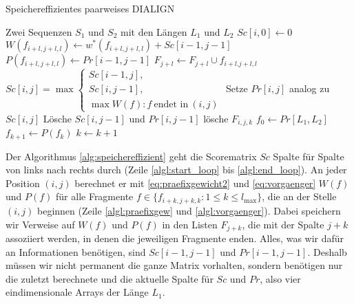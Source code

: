 \begin{breakablealgorithm}
	\caption{Speichereffizientes paarweises DIALIGN}
	\label{alg:speichereffizient}
	\begin{algorithmic}[1]
		
		\Require Zwei Sequenzen $S_1$ und $S_2$ mit den Längen $L_1$ und $L_2$
		\State $Sc[i,0] \gets 0$
		\EndFor
		\label{algl:start_loop}
		\label{algl:fragmentgewichte}
		\State $W(f_{i+l,j+l,l}) \gets w^*(f_{i+l,j+l,l}) + Sc[i\!-\!1,j\!-\!1]$\label{algl:praefixgew}
		\State $P(f_{i+l,j+l,l}) \gets Pr[i\!-\!1,j\!-\!1]$\label{algl:vorgaenger}
		\State $F_{j+l} \gets F_{j+l} \cup {f_{i+l.j+l,l}}$\label{algl:fragmentliste}
		\EndFor
		\State
		$Sc[i,j] = \max
		\begin{cases}
		Sc[i\!-\!1,j], \\
		Sc[i,j\!-\!1], \\
		\max{W(f): f\: \text{endet in}\: (i,j)}
		\end{cases}$\label{algl:praefix}
		\State Setze $Pr[i,j]$ analog zu $Sc[i,j]$\label{algl:ende_opt_kette}
		\State Lösche $Sc[i,j\!-\!1]$ und $Pr[i,j\!-\!1]$\label{algl:del_frags}
		\State lösche $F_{i,j,k}$
		\EndFor
		\EndFor
		\EndFor\label{algl:end_loop}
		\State $f_0 \gets Pr[L_1,L_2]$
		\State $f_{k+1} \gets P(f_{k})$
		\State $k \gets k+1$
		\EndWhile 
		\EndProcedure
	\end{algorithmic}
\end{breakablealgorithm}

Der Algorithmus \ref{alg:speichereffizient} geht die Scorematrix $Sc$ Spalte für Spalte von links nach rechts durch (Zeile \ref{algl:start_loop} bis \ref{algl:end_loop}). An jeder Position $(i,j)$ berechnet er mit \eqref{eq:praefixgewicht2} und \eqref{eq:vorgaenger} $W(f)$ und $P(f)$ für alle Fragmente $f \in \{f_{i+k,j+k,k} : 1 \leq k \leq l_{\max}\}$, die an der Stelle $(i,j)$ beginnen (Zeile \ref{algl:praefixgew} und \ref{algl:vorgaenger}). Dabei speichern wir Verweise auf $W(f)$ und $P(f)$ in den Listen $F_{j+k}$, die mit der Spalte $j+k$ assoziiert werden, in denen die jeweiligen Fragmente enden. Alles, was wir dafür an Informationen benötigen, sind $Sc[i\!-\!1,j\!-\!1]$ und $Pr[i\!-\!1,j\!-\!1]$. Deshalb müssen wir nicht permanent die ganze Matrix vorhalten, sondern benötigen nur die zuletzt berechnete und die aktuelle Spalte für $Sc$ und $Pr$, also vier eindimensionale Arrays der Länge $L_1$.

